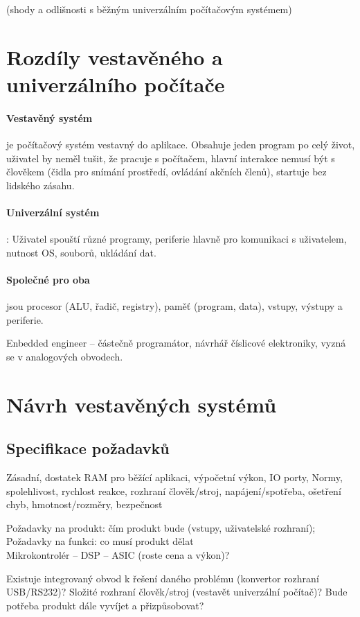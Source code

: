 \documentclass[a4paper, 11pt]{report}
\begin{document}
(shody a odlišnosti s běžným univerzálním počítačovým systémem)

\section{Rozdíly vestavěného a univerzálního počítače}
\paragraph{Vestavěný systém} je počítačový systém vestavný do aplikace. Obsahuje jeden program po celý život, uživatel by neměl tušit, že pracuje s počítačem, hlavní interakce nemusí být s člověkem (čidla pro snímání prostředí, ovládání akčních členů), startuje bez lidského zásahu.

\paragraph{Univerzální systém}: Uživatel spouští různé programy, periferie hlavně pro komunikaci s uživatelem, nutnost OS, souborů, ukládání dat.

\paragraph{Společné pro oba} jsou procesor (ALU, řadič, registry), paměť (program, data), vstupy, výstupy a periferie.

Enbedded engineer -- částečně programátor, návrhář číslicové elektroniky, vyzná se v analogových obvodech.

\section{Návrh vestavěných systémů}
\subsection{Specifikace požadavků}
Zásadní, dostatek RAM pro běžící aplikaci, výpočetní výkon, IO porty, Normy, spolehlivost, rychlost reakce, rozhraní člověk/stroj, napájení/spotřeba, ošetření chyb, hmotnost/rozměry, bezpečnost

Požadavky na produkt: čím produkt bude (vstupy, uživatelské rozhraní); Požadavky na funkci: co musí produkt dělat\\

Mikrokontrolér -- DSP -- ASIC (roste cena a výkon)?

Existuje integrovaný obvod k řešení daného problému (konvertor rozhraní USB/RS232)? Složité rozhraní člověk/stroj (vestavět univerzální počítač)? Bude potřeba produkt dále vyvíjet a přizpůsobovat?
\end{document}
